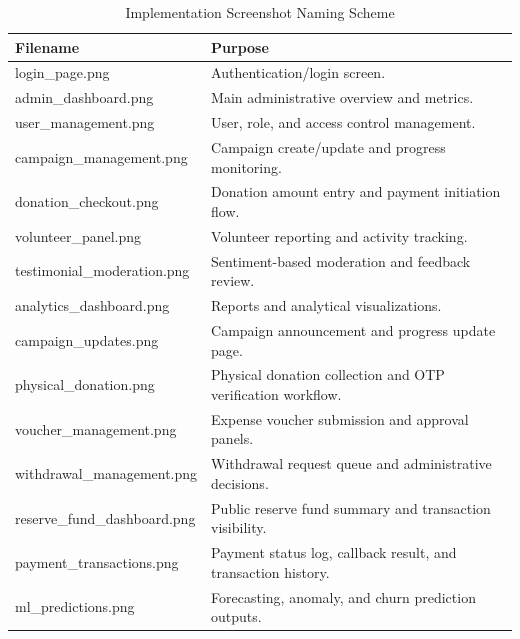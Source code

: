 \documentclass{thesis-library}
\begin{document}
\begin{table}[H]
    \centering
    \caption{Implementation Screenshot Naming Scheme}
    \vspace{10pt}
    \begin{tabularx}{\linewidth}{|P{6.5cm}|L|}
        \hline
        \textbf{Filename} & \textbf{Purpose} \\
        \hline
        login\_page.png & Authentication/login screen. \\
        \hline
        admin\_dashboard.png & Main administrative overview and metrics. \\
        \hline
        user\_management.png & User, role, and access control management. \\
        \hline
        campaign\_management.png & Campaign create/update and progress monitoring. \\
        \hline
        donation\_checkout.png & Donation amount entry and payment initiation flow. \\
        \hline
        volunteer\_panel.png & Volunteer reporting and activity tracking. \\
        \hline
        testimonial\_moderation.png & Sentiment-based moderation and feedback review. \\
        \hline
        analytics\_dashboard.png & Reports and analytical visualizations. \\
        \hline
        campaign\_updates.png & Campaign announcement and progress update page. \\
        \hline
        physical\_donation.png & Physical donation collection and OTP verification workflow. \\
        \hline
        voucher\_management.png & Expense voucher submission and approval panels. \\
        \hline
        withdrawal\_management.png & Withdrawal request queue and administrative decisions. \\
        \hline
        reserve\_fund\_dashboard.png & Public reserve fund summary and transaction visibility. \\
        \hline
        payment\_transactions.png & Payment status log, callback result, and transaction history. \\
        \hline
        ml\_predictions.png & Forecasting, anomaly, and churn prediction outputs. \\
        \hline
    \end{tabularx}
\end{table}
\end{document}
